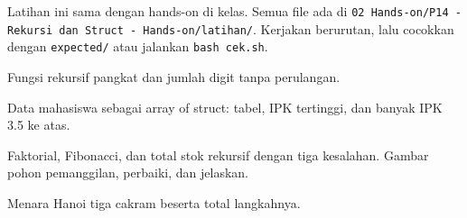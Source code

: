 \documentclass[a4paper]{article}
\begin{document}
Latihan ini sama dengan hands-on di kelas. Semua file ada di \texttt{02 Hands-on/P14 - Rekursi dan Struct - Hands-on/latihan/}. Kerjakan berurutan, lalu cocokkan dengan \texttt{expected/} atau jalankan \texttt{bash cek.sh}.
\par\vspace{4pt}\par\vspace{6pt}
Fungsi rekursif pangkat dan jumlah digit tanpa perulangan.

Data mahasiswa sebagai array of struct: tabel, IPK tertinggi, dan banyak IPK 3.5 ke atas.

Faktorial, Fibonacci, dan total stok rekursif dengan tiga kesalahan. Gambar pohon pemanggilan, perbaiki, dan jelaskan.

Menara Hanoi tiga cakram beserta total langkahnya.
\end{document}
